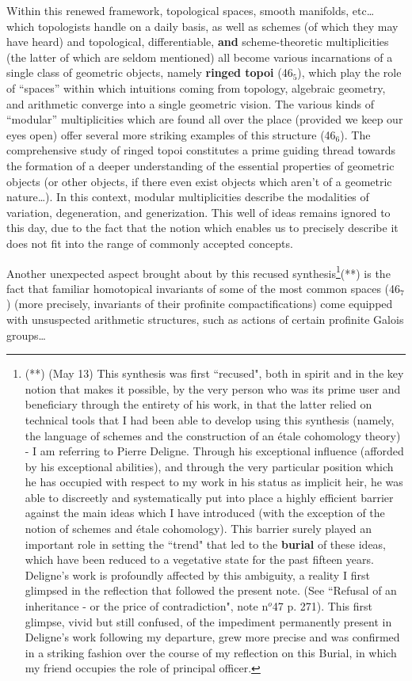 Within this renewed framework, topological spaces, smooth manifolds, etc\ldots \\
which topologists handle on a daily basis,
as well as schemes (of which they may have heard) 
and topological, differentiable, \textbf{and} scheme-theoretic multiplicities (the latter of which are seldom mentioned) 
all become various incarnations of 
a single class of geometric objects, namely \textbf{ringed topoi} 
(46$_5$), which play the role of ``spaces'' within 
which intuitions coming from topology, algebraic geometry, and arithmetic converge
into a single geometric vision.
The various kinds of ``modular'' multiplicities
which are found all over the place
(provided we keep our eyes open) offer several more striking examples of this structure (46$_6$).
The comprehensive study of ringed topoi constitutes a prime guiding thread towards the formation of a deeper understanding of the essential properties of geometric
objects (or other objects, if there even exist objects which aren't of a geometric
nature\ldots).
In this context, modular multiplicities describe the modalities of variation,
degeneration, and generization.
This well of ideas remains ignored to this day, 
due to the fact that the notion which enables us to precisely describe it does not fit into 
the range of commonly accepted concepts.

Another unexpected aspect brought about by this recused synthesis\footnote{(**) (May 13) This synthesis was first ``recused", both in spirit and in the key notion that makes it possible, by the very person who was its prime user and beneficiary through the entirety of his work, in that the latter relied on technical tools that I had been able to develop using this synthesis (namely, the language of schemes and the construction of an \'etale cohomology theory) - I am referring to Pierre Deligne. Through his exceptional influence (afforded by his exceptional abilities), and through the very particular position which he has occupied with respect to my work in his status as implicit heir, he was able to discreetly and systematically put into place a highly efficient barrier against the main ideas which I have introduced (with the exception of the notion of schemes and \'etale cohomology). This barrier surely played an important role in setting the  ``trend" that led to the \textbf{burial} of these ideas, which have been reduced to a vegetative state for the past fifteen years. Deligne's work is profoundly affected by this ambiguity, a reality I first glimpsed in the reflection that followed the present note. (See ``Refusal of an inheritance - or the price of contradiction", note n$^o$47 p. 271). This first glimpse, vivid but still confused, of the impediment permanently present in Deligne's work following my departure, grew more precise and was confirmed in a striking fashion over the course of my reflection on this Burial, in which my friend occupies the role of principal officer.}(**)
is the fact that familiar homotopical invariants 
of some of the most common spaces
(46$_7$)
(more precisely, invariants of their profinite compactifications) 
come equipped with unsuspected arithmetic structures, such as actions of certain profinite
Galois groups\ldots

